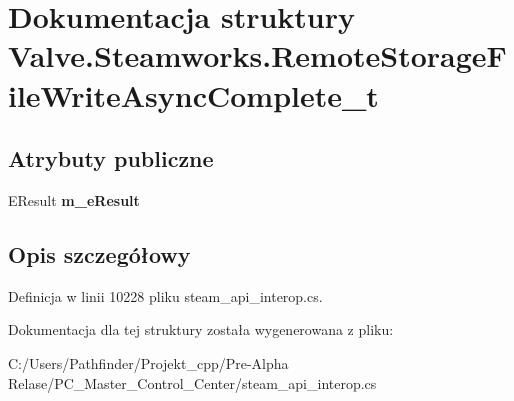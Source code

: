 \hypertarget{struct_valve_1_1_steamworks_1_1_remote_storage_file_write_async_complete__t}{}\section{Dokumentacja struktury Valve.\+Steamworks.\+Remote\+Storage\+File\+Write\+Async\+Complete\+\_\+t}
\label{struct_valve_1_1_steamworks_1_1_remote_storage_file_write_async_complete__t}
\subsection*{Atrybuty publiczne}
\begin{DoxyCompactItemize}
\item 
\mbox{\label{struct_valve_1_1_steamworks_1_1_remote_storage_file_write_async_complete__t_a6f8fdf7fb720efd9d13a43b8f95c1b8b}} 
E\+Result {\bfseries m\+\_\+e\+Result}
\end{DoxyCompactItemize}


\subsection{Opis szczegółowy}


Definicja w linii 10228 pliku steam\+\_\+api\+\_\+interop.\+cs.



Dokumentacja dla tej struktury została wygenerowana z pliku\+:\begin{DoxyCompactItemize}
\item 
C\+:/\+Users/\+Pathfinder/\+Projekt\+\_\+cpp/\+Pre-\/\+Alpha Relase/\+P\+C\+\_\+\+Master\+\_\+\+Control\+\_\+\+Center/steam\+\_\+api\+\_\+interop.\+cs\end{DoxyCompactItemize}
